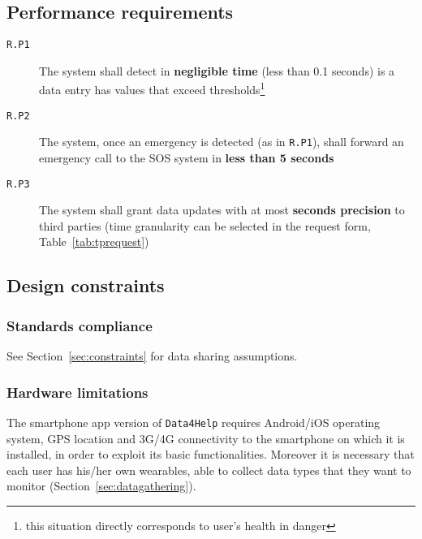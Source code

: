 
  \subsection{Performance requirements}
  \label{sec:performance}

    \begin{description}
      \item[\texttt{R.P1}] The system shall detect in \textbf{negligible time} (less than 0.1 seconds) is a data entry has values that exceed thresholds\footnote{this situation directly corresponds to user's health in danger}
      \item[\texttt{R.P2}] The system, once an emergency is detected (as in \texttt{R.P1}), shall forward an emergency call to the SOS system in \textbf{less than 5 seconds}
      \item[\texttt{R.P3}] The system shall grant data updates with at most \textbf{seconds precision} to third parties (time granularity can be selected in the request form, Table~\ref{tab:tprequest})
    \end{description}

  \subsection{Design constraints}

    \subsubsection{Standards compliance}

      See Section~\ref{sec:constraints} for data sharing assumptions.

    \subsubsection{Hardware limitations}

      The smartphone app version of \texttt{Data4Help} requires Android/iOS operating system, GPS location and 3G/4G connectivity to the smartphone on which it is installed, in order to exploit its basic functionalities. Moreover it is necessary that each user has his/her own wearables, able to collect data types that they want to monitor (Section~\ref{sec:datagathering}).


